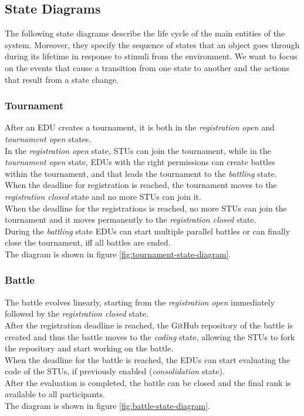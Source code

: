 \subsection{State Diagrams}
The following state diagrams describe the life cycle of the main entities of the system.
Moreover, they specify the sequence of states that an object goes through during its lifetime in response to stimuli from the environment.
We want to focus on the events that cause a transition from one state to another and the actions that result from a state change.

\newpage

\subsubsection*{Tournament}
After an EDU creates a tournament, it is both in the \textit{registration open} and \textit{tournament open} states.\\
In the \textit{registration open} state, STUs can join the tournament, while in the \textit{tournament open} state, EDUs with the right permissions can create battles within the tournament, and that leads the tournament to the \textit{battling} state.\\
When the deadline for registration is reached, the tournament moves to the \textit{registration closed} state and no more STUs can join it.\\
When the deadline for the registrations is reached, no more STUs can join the tournament and it moves permanently to the \textit{registration closed} state.\\
During the \textit{battling} state EDUs can start multiple parallel battles or can finally close the tournament, iff all battles are ended.\\
The diagram is shown in figure \ref{fig:tournament-state-diagram}.

\subsubsection*{Battle}
The battle evolves linearly, starting from the \textit{registration open} immediately followed by the \textit{registration closed} state.\\
After the registration deadline is reached, the GitHub repository of the battle is created and thus the battle moves to the \textit{coding} state, allowing the STUs to fork the repository and start working on the battle.\\
When the deadline for the battle is reached, the EDUs can start evaluating the code of the STUs, if previously enabled (\textit{consolidation} state). \\
After the evaluation is completed, the battle can be closed and the final rank is available to all participants.\\
The diagram is shown in figure \ref{fig:battle-state-diagram}.

